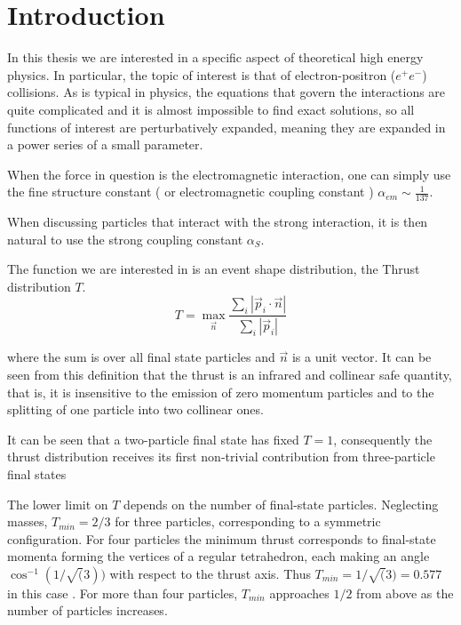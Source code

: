 \documentclass[../main.tex]{subfiles}
\begin{document}
\section{Introduction}

In this thesis we are interested in a specific aspect of theoretical high energy physics. In particular,
the topic of interest is that of electron-positron ($e^+e^-$) collisions. As is typical in physics, the equations that govern
the interactions are quite complicated and it is almost impossible to find exact solutions, so all
functions of interest are perturbatively expanded, meaning they are expanded in a power series
of a small parameter. 

When the force in question is the electromagnetic interaction, one can
simply use the fine structure constant ( or electromagnetic coupling constant ) $\alpha_{em} \sim \frac{1}{137} $.

When discussing particles that interact with the strong interaction, it is then natural to use the strong
coupling constant $ \alpha_S $.

The function we are interested in is an event shape distribution, the Thrust distribution $T$.
\begin{equation} \label{eq:Thrust}
    T = \max_{\vec{n}} \frac{\sum_i |\vec{p}_i \cdot \vec{n}|}{\sum_i |\vec{p}_i|}
\end{equation}

where the sum is over all final state particles and $\vec{n}$ is a unit vector.
It can be seen from this definition that the thrust is an infrared and collinear safe
quantity, that is, it is insensitive to the emission of zero momentum particles and to the splitting of 
one particle into two collinear ones.

It can be seen that a two-particle final state has fixed $T = 1$, consequently the thrust
distribution receives its first non-trivial contribution from three-particle final states

The lower limit on $T$ depends on the number of final-state particles.
Neglecting masses, $T_{min} = 2/3$ for three particles, corresponding to a symmetric
configuration. For four particles the minimum thrust corresponds to final-state
momenta forming the vertices of a regular tetrahedron, each making an angle
$\cos^{-1}(1/\sqrt(3))$ with respect to the thrust axis. Thus $T_{min} = 1/\sqrt(3) = 0.577$ in this
case . For more than four particles, $T_{min}$ approaches $1/2$ from above as the number of particles increases.
\end{document}
